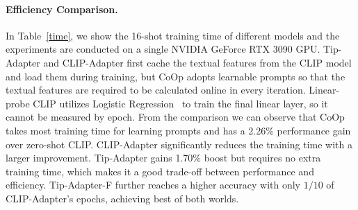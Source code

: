 \documentclass[10pt,twocolumn,letterpaper]{article}
\begin{document}
\paragraph{Efficiency Comparison.}
In Table~\ref{time}, we show the 16-shot training time of different models and the experiments are conducted on a single NVIDIA GeForce RTX 3090 GPU. Tip-Adapter and CLIP-Adapter first cache the textual features from the CLIP model and load them during training, but CoOp adopts learnable prompts so that the textual features are required to be calculated online in every iteration. Linear-probe CLIP utilizes Logistic Regression~\cite{wright1995logistic} to train the final linear layer, so it cannot be measured by epoch. From the comparison we can observe that CoOp takes most training time for learning prompts and has a 2.26$\%$ performance gain over zero-shot CLIP. CLIP-Adapter significantly reduces the training time with a larger improvement. Tip-Adapter gains 1.70$\%$ boost but requires no extra training time, which makes it a good trade-off between performance and efficiency. Tip-Adapter-F further reaches a higher accuracy with only $1/10$ of CLIP-Adapter's epochs, achieving best of both worlds.
\end{document}
